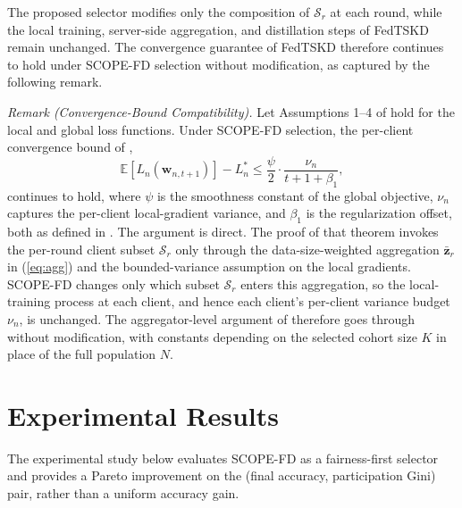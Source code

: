\documentclass[journal]{IEEEtran}
\begin{document}
The proposed selector modifies only the composition of $\mathcal{S}_r$ at each round, while the local training, server-side aggregation, and distillation steps of FedTSKD \cite{mu2024fedtskd} remain unchanged. The convergence guarantee of FedTSKD therefore continues to hold under SCOPE-FD selection without modification, as captured by the following remark.

\textit{Remark (Convergence-Bound Compatibility).} Let Assumptions 1--4 of \cite{mu2024fedtskd} hold for the local and global loss functions. Under SCOPE-FD selection, the per-client convergence bound of \cite[Theorem~1]{mu2024fedtskd},
\begin{equation}
\mathbb{E}\!\left[L_n\!\left(\bm{w}_{n,t+1}\right)\right] - L_n^{*} \le \frac{\psi}{2}\cdot\frac{\nu_n}{t+1+\beta_1},
\label{eq:conv_bound}
\end{equation}
continues to hold, where $\psi$ is the smoothness constant of the global objective, $\nu_n$ captures the per-client local-gradient variance, and $\beta_1$ is the regularization offset, both as defined in \cite[Theorem~1]{mu2024fedtskd}. The argument is direct. The proof of that theorem invokes the per-round client subset $\mathcal{S}_r$ only through the data-size-weighted aggregation $\bar{\bm{z}}_r$ in (\ref{eq:agg}) and the bounded-variance assumption on the local gradients. SCOPE-FD changes only which subset $\mathcal{S}_r$ enters this aggregation, so the local-training process at each client, and hence each client's per-client variance budget $\nu_n$, is unchanged. The aggregator-level argument of \cite{mu2024fedtskd} therefore goes through without modification, with constants depending on the selected cohort size $K$ in place of the full population $N$.


\section{Experimental Results}
\label{sec:experiments}

The experimental study below evaluates SCOPE-FD as a fairness-first selector and provides a Pareto improvement on the (final accuracy, participation Gini) pair, rather than a uniform accuracy gain.
\end{document}
